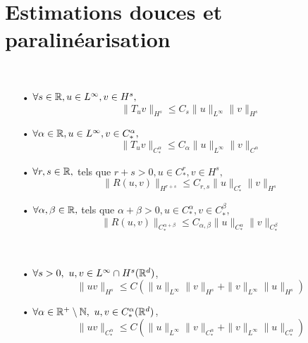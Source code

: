 \documentclass[11pt,a4paper]{article}
\begin{document}
\section{Estimations douces et paralinéarisation}

\begin{prop} ~\\
\begin{itemize}
\item[•] $\forall s\in \mathbb R, u \in L^\infty, v\in H^s,$
\begin{equation*}
\|T_uv\|_{H^s} \leq C_s \|u\|_{L^\infty} \|v\|_{H^s}
\end{equation*}
\item[•] $\forall \alpha \in \mathbb R, u \in L^\infty, v\in C^\alpha_*,$
\begin{equation*}
\|T_uv\|_{C^\alpha_*} \leq C_\alpha \|u\|_{L^\infty} \|v\|_{C^\alpha}
\end{equation*}
\item[•] $\forall r,s\in \mathbb R,$ tels que $r+s>0, u \in C^r_*, v\in H^s,$
\begin{equation*}
\|R(u,v)\|_{H^{r+s}} \leq C_{r,s} \|u\|_{C^r_*} \|v\|_{H^s}
\end{equation*}
\item[•] $\forall \alpha,\beta\in \mathbb R,$ tels que $\alpha + \beta>0, u \in C^\alpha_*, v\in C^\beta_*,$
\begin{equation*}
\|R(u,v)\|_{C^{\alpha + \beta}_*} \leq C_{\alpha,\beta} \|u\|_{C^\alpha_*} \|v\|_{C^\beta_*}
\end{equation*}
\end{itemize}
\end{prop}

\begin{prop} ~\\
\begin{itemize}
\item[•] $\forall s>0,\ u,v \in L^\infty \cap H^s(\mathbb R^d)$,
\begin{equation*}
\|uv\|_{H^s} \leq C (\|u\|_{L^\infty}\|v\|_{H^s} + \|v\|_{L^\infty}\|u\|_{H^s})
\end{equation*}
\item[•] $\forall \alpha \in \mathbb R^+ \setminus \mathbb N,\ u,v \in C^\alpha_*(\mathbb R^d)$,
\begin{equation*}
\|uv\|_{C^\alpha_*} \leq C (\|u\|_{L^\infty}\|v\|_{C^\alpha_*} + \|v\|_{L^\infty}\|u\|_{C^\alpha_*})
\end{equation*}
\end{itemize}
\end{prop}
\end{document}
